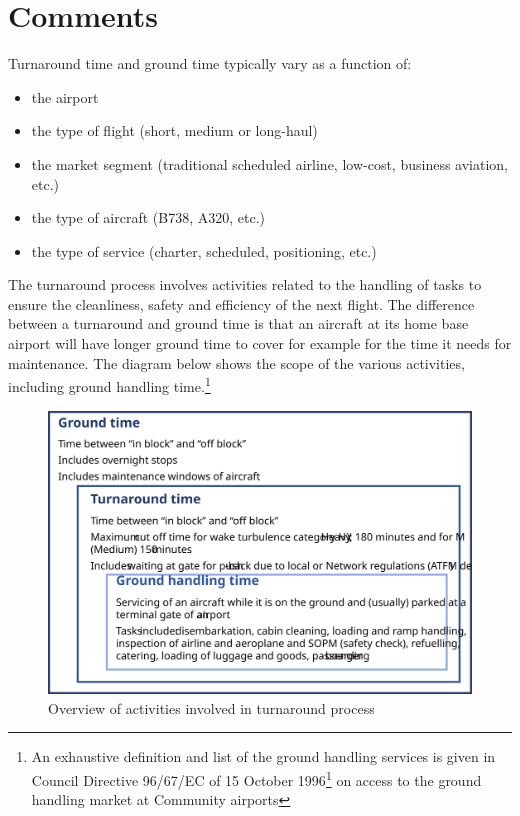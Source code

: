 \documentclass[
  11pt,
  a4paper,
]{book}
\DeclareRobustCommand{\href}[2]{#2\footnote{\url{#1}}}
\begin{document}
\hypertarget{comments-7}{%
\section{Comments}\label{comments-7}}

Turnaround time and ground time typically vary as a function of:

\begin{itemize}
\item
  the airport
\item
  the type of flight (short, medium or long-haul)
\item
  the market segment (traditional scheduled airline, low-cost, business
  aviation, etc.)
\item
  the type of aircraft (B738, A320, etc.)
\item
  the type of service (charter, scheduled, positioning, etc.)
\end{itemize}

The turnaround process involves activities related to the handling of
tasks to ensure the cleanliness, safety and efficiency of the next
flight. The difference between a turnaround and ground time is that an
aircraft at its home base airport will have longer ground time to cover
for example for the time it needs for maintenance. The diagram below
shows the scope of the various activities, including ground handling
time.\footnote{An exhaustive definition and list of the ground handling
  services is given in
  \href{http://eur-lex.europa.eu/legal-content/EN/ALL/?uri=CELEX\%3A31996L0067}{Council
  Directive 96/67/EC of 15 October 1996} on access to the ground
  handling market at Community airports}

\begin{figure}

{\centering \includegraphics{chapters/../figures/turnaround_activities.svg}

}

\caption{\label{fig-turnaround-activities}Overview of activities
involved in turnaround process}

\end{figure}
\end{document}
